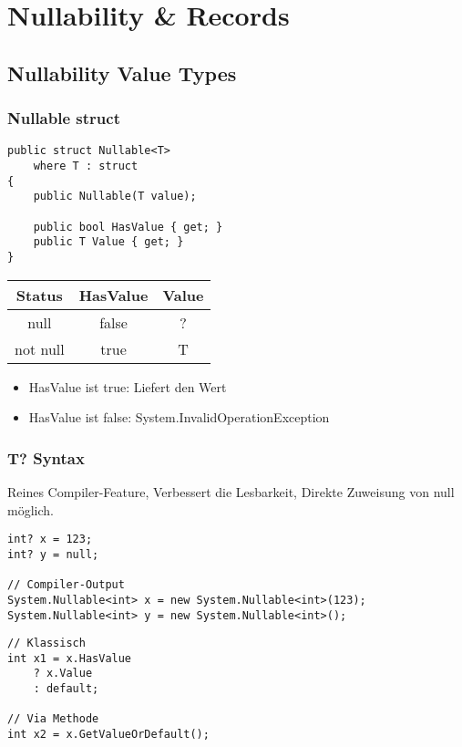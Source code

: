 
\section{Nullability \& Records}

\begin{multicols*}{2}
\subsection{Nullability Value Types}
\subsubsection{Nullable struct}
\begin{lstlisting}
public struct Nullable<T> 
    where T : struct
{   
    public Nullable(T value);

    public bool HasValue { get; }
    public T Value { get; }
}
\end{lstlisting}
\begin{tabular}{| c | c | c |}
\hline
Status & HasValue & Value\\ \hline\hline
null & false & ? \\ \hline
not null & true & T\\
\hline
\end{tabular}
\vspace*{2mm}
\begin{itemize}
    \item HasValue ist true: Liefert den Wert
    \item HasValue ist false: System.InvalidOperationException
\end{itemize}
\subsubsection*{T? Syntax}
Reines Compiler-Feature, Verbessert die Lesbarkeit, Direkte Zuweisung von null möglich.
\begin{lstlisting}
int? x = 123; 
int? y = null;

// Compiler-Output
System.Nullable<int> x = new System.Nullable<int>(123);
System.Nullable<int> y = new System.Nullable<int>();
\end{lstlisting}
\begin{lstlisting}
// Klassisch
int x1 = x.HasValue 
    ? x.Value
    : default;

// Via Methode
int x2 = x.GetValueOrDefault();


\end{lstlisting}
\end{multicols*}
